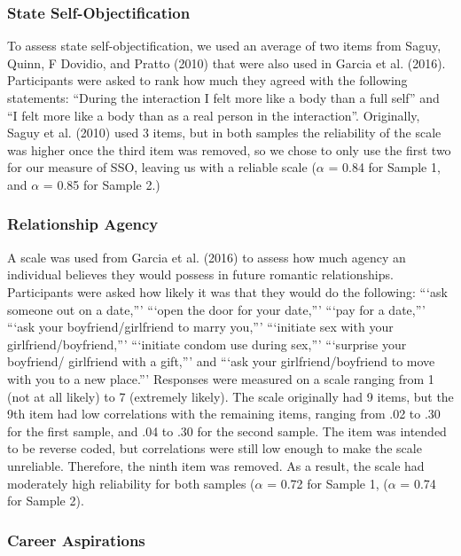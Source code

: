 \documentclass[man]{apa6}
\begin{document}
\subsubsection{State
Self-Objectification}\label{state-self-objectification}

To assess state self-objectification, we used an average of two items
from Saguy, Quinn, F Dovidio, and Pratto (2010) that were also used in
Garcia et al. (2016). Participants were asked to rank how much they
agreed with the following statements: \enquote{During the interaction I
felt more like a body than a full self} and \enquote{I felt more like a
body than as a real person in the interaction}. Originally, Saguy et al.
(2010) used 3 items, but in both samples the reliability of the scale
was higher once the third item was removed, so we chose to only use the
first two for our measure of SSO, leaving us with a reliable scale
(\(\alpha\) = 0.84 for Sample 1, and \(\alpha\) = 0.85 for Sample 2.)

\subsubsection{Relationship Agency}\label{relationship-agency}

A scale was used from Garcia et al. (2016) to assess how much agency an
individual believes they would possess in future romantic relationships.
Participants were asked how likely it was that they would do the
following: \enquote{`ask someone out on a date,}' \enquote{`open the
door for your date,}' \enquote{`pay for a date,}' \enquote{`ask your
boyfriend/girlfriend to marry you,}' \enquote{`initiate sex with your
girlfriend/boyfriend,}' \enquote{`initiate condom use during sex,}'
\enquote{`surprise your boyfriend/ girlfriend with a gift,}' and
\enquote{`ask your girlfriend/boyfriend to move with you to a new
place.}' Responses were measured on a scale ranging from 1 (not at all
likely) to 7 (extremely likely). The scale originally had 9 items, but
the 9th item had low correlations with the remaining items, ranging from
.02 to .30 for the first sample, and .04 to .30 for the second sample.
The item was intended to be reverse coded, but correlations were still
low enough to make the scale unreliable. Therefore, the ninth item was
removed. As a result, the scale had moderately high reliability for both
samples (\(\alpha\) = 0.72 for Sample 1, (\(\alpha\) = 0.74 for Sample
2).

\subsubsection{Career Aspirations}\label{career-aspirations}
\end{document}
